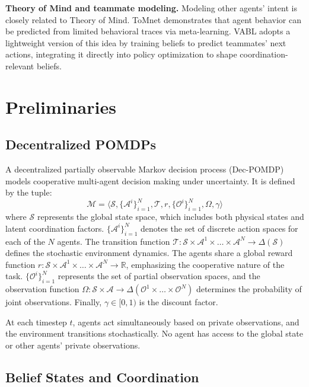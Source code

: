 \documentclass{article}
\theoremstyle{plain}
\theoremstyle{definition}
\theoremstyle{remark}
\begin{document}
\textbf{Theory of Mind and teammate modeling.}
Modeling other agents' intent is closely related to Theory of Mind. ToMnet \cite{rabinowitz2018tomnet} demonstrates that agent behavior can be predicted from limited behavioral traces via meta-learning. VABL adopts a lightweight version of this idea by training beliefs to predict teammates' next actions, integrating it directly into policy optimization to shape coordination-relevant beliefs.

\section{Preliminaries}
\label{sec:prelim}

\subsection{Decentralized POMDPs}
A decentralized partially observable Markov decision process (Dec-POMDP) models cooperative multi-agent decision making under uncertainty. It is defined by the tuple:
\begin{equation}
\mathcal{M} = \langle \mathcal{S}, \{\mathcal{A}^i\}_{i=1}^N, \mathcal{T}, r, \{\mathcal{O}^i\}_{i=1}^N, \Omega, \gamma \rangle
\end{equation}
where $\mathcal{S}$ represents the global state space, which includes both physical states and latent coordination factors. $\{\mathcal{A}^i\}_{i=1}^N$ denotes the set of discrete action spaces for each of the $N$ agents. The transition function $\mathcal{T}: \mathcal{S} \times \mathcal{A}^1 \times \dots \times \mathcal{A}^N \rightarrow \Delta(\mathcal{S})$ defines the stochastic environment dynamics. The agents share a global reward function $r: \mathcal{S} \times \mathcal{A}^1 \times \dots \times \mathcal{A}^N \rightarrow \mathbb{R}$, emphasizing the cooperative nature of the task. $\{\mathcal{O}^i\}_{i=1}^N$ represents the set of partial observation spaces, and the observation function $\Omega: \mathcal{S} \times \mathcal{A} \rightarrow \Delta(\mathcal{O}^1 \times \dots \times \mathcal{O}^N)$ determines the probability of joint observations. Finally, $\gamma \in [0,1)$ is the discount factor.

At each timestep $t$, agents act simultaneously based on private observations, and the environment transitions stochastically. No agent has access to the global state or other agents’ private observations.

\subsection{Belief States and Coordination}
\end{document}
